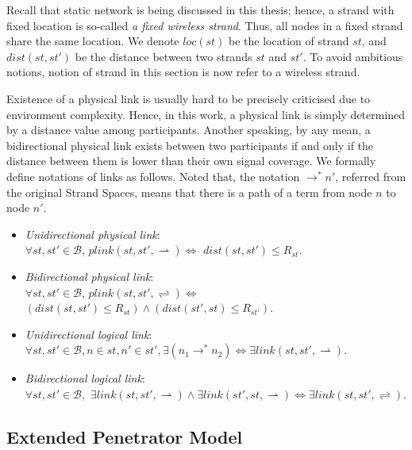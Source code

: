 Recall that static network is being discussed in this thesis; hence, a strand with fixed location is so-called \textit{a fixed wireless strand}. Thus, all nodes in a fixed strand share the same location. We denote $loc(st)$ be the location of strand $st$, and $dist(st,st')$ be the distance between two strands $st$ and $st'$. To avoid ambitious notions, notion of strand in this section is now refer to a wireless strand. 

Existence of a physical link is usually hard to be precisely criticised due to environment complexity. Hence, in this work, a physical link is simply determined by a distance value among participants. Another speaking, by any mean, a bidirectional physical link exists between two participants if and only if the distance between them is lower than their own signal coverage. We formally define notations of links as follows. Noted that, the notation $ \rightarrow^* n'$, referred from the original Strand Spaces, means that there is a path of a term from node $n$ to node $n'$.  

\begin{Definition}
\begin{itemize}
\item \emph{Unidirectional physical link}:  \\ $\forall st,st' \in \mathcal{B}$, $plink(st,st', \rightharpoonup) \Leftrightarrow$ $dist(st,st') \le R_{st}$.
\item \emph{Bidirectional physical link}: \\ $\forall st,st' \in \mathcal{B}$, $plink(st,st', \rightleftharpoons) \Leftrightarrow$ $(dist(st,st') \le R_{st}) \wedge (dist(st',st) \le R_{st'})$.
\item \emph{Unidirectional logical link}: \\ $\forall st, st' \in \mathcal{B}, n \in st, n' \in st', \exists (n_1 \rightarrow^* n_2) \Leftrightarrow \exists link(st, st',\rightharpoonup)$.
\item \emph{Bidirectional logical link}: \\ $\forall st, st' \in \mathcal{B},$ $ \exists link(st, st',\rightharpoonup) \wedge \exists link(st', st,\rightharpoonup) \Leftrightarrow \exists link(st, st',\rightleftharpoons)$.
\end{itemize}	
\end{Definition}

\subsection{Extended Penetrator Model}\label{penndp2}


